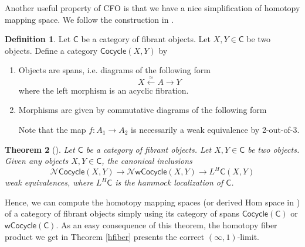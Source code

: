 \documentclass[12pt]{amsart}
\newtheorem{thm}{Theorem}[section]
\theoremstyle{definition}
\newtheorem{defn}[thm]{Definition}
\theoremstyle{remark}
\numberwithin{equation}{section}
\newcommand{\CC}{{\mathsf C}}
\newcommand{\1}{{\mathbb{1}}}
\newcommand{\cocycle}{\mathsf{Cocycle}}
\newcommand{\wcocycle}{\mathsf{wCocycle}}
\newcommand{\io}{\operatorname{(\infty, 1)}}
\begin{document}
Another useful property of CFO is that we have a nice simplification of homotopy mapping space. We follow the construction in \cite[Section 3.6.3]{NSS12}.
\begin{defn}
    Let $\CC$ be a category of fibrant objects. Let $X, Y \in \CC$ be two objects. Define a category $\cocycle(X,Y)$ by
   \begin{enumerate}
       \item Objects are spans, i.e. diagrams of the following form
       $$X \stackrel{\simeq}{\longleftarrow}
  A
  \stackrel{}{\longrightarrow}
  Y$$ where the left morphism is an acyclic fibration.
  \item Morphisms are given by commutative diagrams of the following form
  \begin{center}
  \end{center}
  Note that the map $f:A_1\to A_2$ is necessarily a weak equivalence by 2-out-of-3. 
   \end{enumerate}
\end{defn}

\begin{thm}[\cite{NSS12}]
    Let $\CC$ be a category of fibrant objects. Let $X, Y \in \CC$ be two objects. Given any objects $X, Y\in \CC$, the canonical inclusions
    \begin{equation*}
        \mathcal{N} \cocycle(X, Y)\to \mathcal{N} \wcocycle(X, Y) \to L^H\CC(X,Y)
    \end{equation*}
    weak equivalences, where $L^H \CC$ is the hammock localization of $\CC$.
\end{thm}
Hence, we can compute the homotopy mapping spaces (or derived Hom space in \cite{NSS12}) of a category of fibrant objects simply using its category of spans $\cocycle(\CC)$ or $\wcocycle(\CC)$. As an easy consequence of this theorem, the homotopy fiber product we get in Theorem \ref{hfiber} presents the correct $\io$-limit. 
\end{document}
